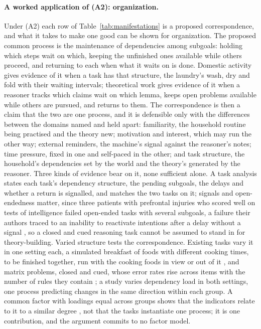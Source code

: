 \paragraph{A worked application of (A2): organization.} Under (A2) each row of Table~\ref{tab:manifestations} is a proposed correspondence, and what it takes to make one good can be shown for organization. The proposed common process is the maintenance of dependencies among subgoals: holding which steps wait on which, keeping the unfinished ones available while others proceed, and returning to each when what it waits on is done. Domestic activity gives evidence of it when a task has that structure, the laundry's wash, dry and fold with their waiting intervals; theoretical work gives evidence of it when a reasoner tracks which claims wait on which lemma, keeps open problems available while others are pursued, and returns to them. The correspondence is then a claim that the two are one process, and it is defensible only with the differences between the domains named and held apart: familiarity, the household routine being practised and the theory new; motivation and interest, which may run the other way; external reminders, the machine's signal against the reasoner's notes; time pressure, fixed in one and self-paced in the other; and task structure, the household's dependencies set by the world and the theory's generated by the reasoner. Three kinds of evidence bear on it, none sufficient alone. A task analysis states each task's dependency structure, the pending subgoals, the delays and whether a return is signalled, and matches the two tasks on it; signals and open-endedness matter, since three patients with prefrontal injuries who scored well on tests of intelligence failed open-ended tasks with several subgoals, a failure their authors traced to an inability to reactivate intentions after a delay without a signal \cite{ShalliceBurgess1991}, so a closed and cued reasoning task cannot be assumed to stand in for theory-building. Varied structure tests the correspondence. Existing tasks vary it in one setting each, a simulated breakfast of foods with different cooking times, to be finished together, run with the cooking foods in view or out of it \cite{CraikBialystok2006}, and matrix problems, closed and cued, whose error rates rise across items with the number of rules they contain \cite{CarpenterJustShell1990}; a study varies dependency load in both settings, one process predicting changes in the same direction within each group. A common factor with loadings equal across groups shows that the indicators relate to it to a similar degree \cite{PutnickBornstein2016}, not that the tasks instantiate one process; it is one contribution, and the argument commits to no factor model.

